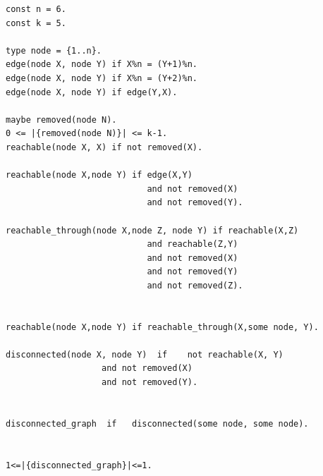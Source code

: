 \documentclass[a4paper,10pt]{article}
\providecommand{\DIFaddbegin}{} %
\providecommand{\DIFaddend}{} %
\providecommand{\DIFdelend}{} %
\begin{document}

\DIFdelend \DIFaddbegin \begin{verbatim}
const n = 6.
const k = 5.

type node = {1..n}.
edge(node X, node Y) if X%n = (Y+1)%n.
edge(node X, node Y) if X%n = (Y+2)%n.
edge(node X, node Y) if edge(Y,X).

maybe removed(node N).
0 <= |{removed(node N)}| <= k-1.
reachable(node X, X) if not removed(X).

reachable(node X,node Y) if edge(X,Y) 
                            and not removed(X)                                                                                                               
                            and not removed(Y). 

reachable_through(node X,node Z, node Y) if reachable(X,Z)
                            and reachable(Z,Y) 
                            and not removed(X) 
                            and not removed(Y) 
                            and not removed(Z).


reachable(node X,node Y) if reachable_through(X,some node, Y).

disconnected(node X, node Y)  if    not reachable(X, Y) 
                   and not removed(X)
                   and not removed(Y).                


disconnected_graph  if   disconnected(some node, some node).                 


1<=|{disconnected_graph}|<=1.
\end{verbatim}
\DIFaddend %
%
\end{document}

